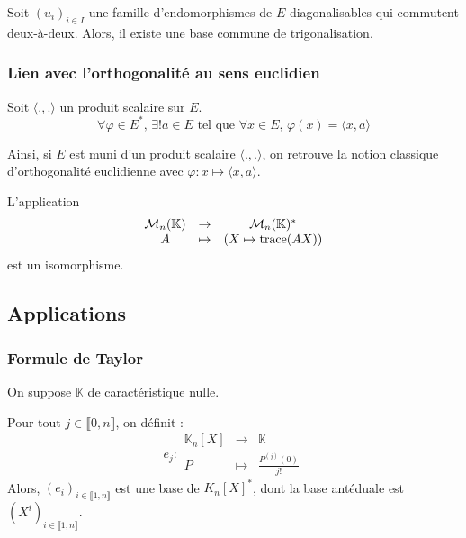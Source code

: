 	\begin{application}
		Soit $(u_i)_{i \in I}$ une famille d'endomorphismes de $E$ diagonalisables qui commutent deux-à-deux. Alors, il existe une base commune de trigonalisation.
	\end{application}
	
	\subsubsection{Lien avec l'orthogonalité au sens euclidien}
	
	
	\begin{theorem}
		Soit $\langle ., . \rangle$ un produit scalaire sur $E$.
		\[ \forall \varphi \in E^*, \, \exists! a \in E \text{ tel que } \forall x \in E, \, \varphi(x) = \langle x, a \rangle \]
	\end{theorem}
	
	
	Ainsi, si $E$ est muni d'un produit scalaire $\langle ., . \rangle$, on retrouve la notion classique d'orthogonalité euclidienne avec $\varphi : x \mapsto \langle x, a \rangle$.
	
	
	\begin{example}
		L'application
		\[
		\begin{array}{ccc}
			\mathcal{M}_n(\mathbb{K}) &\rightarrow& \mathcal{M}_n(\mathbb{K})^* \\
			A &\mapsto& (X \mapsto \operatorname{trace}(AX))
		\end{array}
		\]
		est un isomorphisme.
	\end{example}
	
	\newpage
	
	\subsection{Applications}
	
	\subsubsection{Formule de Taylor}
	
	
	On suppose $\mathbb{K}$ de caractéristique nulle. 
	
	\begin{application}
		Pour tout $j \in \llbracket 0, n \rrbracket$, on définit :
		\[
		e_j : \begin{array}{ccc}
			\mathbb{K}_n[X] &\rightarrow& \mathbb{K} \\
			P &\mapsto& \frac{P^{(j)}(0)}{j!}
		\end{array}
		\]
		Alors, $(e_i)_{i \in \llbracket 1, n \rrbracket}$ est une base de $K_n[X]^*$, dont la base antéduale est $(X^i)_{i \in \llbracket 1, n \rrbracket}$.
	\end{application}
	

